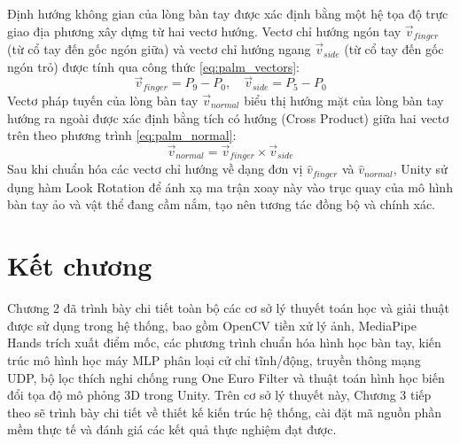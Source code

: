 \documentclass[../BTL.tex]{subfiles}
\begin{document}
Định hướng không gian của lòng bàn tay được xác định bằng một hệ tọa độ trực giao địa phương xây dựng từ hai vectơ hướng. Vectơ chỉ hướng ngón tay $\vec{v}_{finger}$ (từ cổ tay đến gốc ngón giữa) và vectơ chỉ hướng ngang $\vec{v}_{side}$ (từ cổ tay đến gốc ngón trỏ) được tính qua công thức \eqref{eq:palm_vectors}:
\begin{equation}
\label{eq:palm_vectors}
\vec{v}_{finger} = P_9 - P_0, \quad \vec{v}_{side} = P_5 - P_0
\end{equation}
Vectơ pháp tuyến của lòng bàn tay $\vec{v}_{normal}$ biểu thị hướng mặt của lòng bàn tay hướng ra ngoài được xác định bằng tích có hướng (Cross Product) giữa hai vectơ trên theo phương trình \eqref{eq:palm_normal}:
\begin{equation}
\label{eq:palm_normal}
\vec{v}_{normal} = \vec{v}_{finger} \times \vec{v}_{side}
\end{equation}
Sau khi chuẩn hóa các vectơ chỉ hướng về dạng đơn vị $\hat{v}_{finger}$ và $\hat{v}_{normal}$, Unity sử dụng hàm Look Rotation để ánh xạ ma trận xoay này vào trục quay của mô hình bàn tay ảo và vật thể đang cầm nắm, tạo nên tương tác đồng bộ và chính xác.

\section*{Kết chương}
Chương 2 đã trình bày chi tiết toàn bộ các cơ sở lý thuyết toán học và giải thuật được sử dụng trong hệ thống, bao gồm OpenCV tiền xử lý ảnh, MediaPipe Hands trích xuất điểm mốc, các phương trình chuẩn hóa hình học bàn tay, kiến trúc mô hình học máy MLP phân loại cử chỉ tĩnh/động, truyền thông mạng UDP, bộ lọc thích nghi chống rung One Euro Filter và thuật toán hình học biến đổi tọa độ mô phỏng 3D trong Unity. Trên cơ sở lý thuyết này, Chương 3 tiếp theo sẽ trình bày chi tiết về thiết kế kiến trúc hệ thống, cài đặt mã nguồn phần mềm thực tế và đánh giá các kết quả thực nghiệm đạt được.
\end{document}
